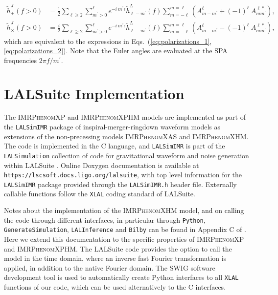 \documentclass[%
aps,
prd,
amssymb,
amsmath,
amsfonts,
eqsecnum,
showpacs,
nofootinbib,
floatfix,
twocolumn,
twoside,
a4paper,
superscriptaddress
]{revtex4-1}
\newcommand{\n}{\newline}
\newcommand{\phX}{\textsc{IMRPhenomXAS}\xspace}
\newcommand{\phXHM}{\textsc{IMRPhenomXHM}\xspace}
\newcommand{\phXP}{\textsc{IMRPhenomXP}\xspace}
\newcommand{\phXPHM}{\textsc{IMRPhenomXPHM}\xspace}
\begin{document}
\begin{align}
\label{eq:fourier_polariz_positive}
     \tilde h^J_+(f>0) &= 
     \frac{1}{2} \sum_{\ell \geq 2} \sum_{m^{\prime}>0}^{\ell}  e^{-i\:m^{\prime}\epsilon} \tilde{h}_{\ell - m^{\prime}}^{L}(f) \sum_{m=-\ell}^{m=\ell} \left(  A^{\ell}_{m -m^{\prime}} + (-1)^{\ell} \: A^{\ell \ast}_{m m^{\prime}} \right),
     \\
     \tilde h^J_{\times}(f>0) &= 
     \frac{i}{2} \sum_{\ell \geq 2} \sum_{m^{\prime}>0}^{\ell}  e^{-i\:m^{\prime}\epsilon} \tilde{h}_{\ell-m^{\prime}}^{L}(f) \sum_{m=-\ell}^{m=\ell} \left(  A^{\ell}_{m-m^{\prime}} -(-1)^{\ell} \: A^{\ell \ast}_{m m^{\prime}} \right),
\end{align}
which are equivalent to the expressions in Eqs.~(\ref{eq:polarizations_1}, \ref{eq:polarizations_2}). Note that the Euler angles are evaluated at the SPA frequencies $2\pi f / m^{\prime}$.


\section{LALSuite Implementation}
\label{appendix:lal_implementation}

The \phXP and \phXPHM models are implemented as part of the
{\tt LALSimIMR} package of inspiral-merger-ringdown waveform models as extensions of the non-precessing models  \phX \cite{Pratten:2020fqn} and \phXHM \cite{Garcia-Quiros:2020qpx}.
The code is implemented in the C language, and 
{\tt LALSimIMR} is 
part of the {\tt LALSimulation} collection of code for gravitational waveform and noise generation within LALSuite \cite{lalsuite}.
Online Doxygen documentation is available at {\tt https://lscsoft.docs.ligo.org/lalsuite}, with top level information for the {\tt LALSimIMR} package
provided through the {\tt LALSimIMR.h} header file.
Externally callable functions follow the \texttt{XLAL} coding standard of LALSuite.
%

Notes about the implementation of the \phXHM model, and on calling the code through different interfaces, in particular through \texttt{Python}, \texttt{GenerateSimulation}, \texttt{LALInference} \cite{Veitch:2014wba} and \texttt{Bilby} \cite{Ashton:2018jfp}
can be found in Appendix C of \cite{Garcia-Quiros:2020qpx}.
%
Here we extend this documentation to the specific properties of \phXP and \phXPHM. The LALSuite code provides the option to call the model in the time domain,  where an inverse fast Fourier transformation is applied, in addition to the native Fourier domain. The SWIG \cite{Beazley:1996swig,SWIG:code} software development tool is used to automatically create Python interfaces to all \texttt{XLAL} functions \cite{Wette:2020swig} of our code, which can be used alternatively to the C interfaces. 
\end{document}
